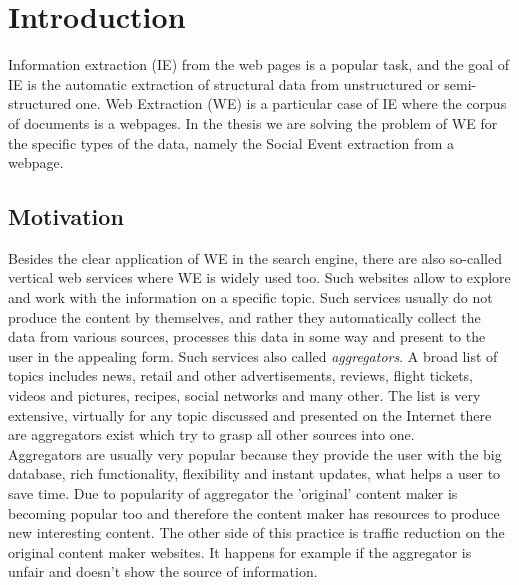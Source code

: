 \chapter{Introduction}
\label{chap:intro}
Information extraction (IE) from the web pages is a popular task, and the goal of IE is the automatic extraction of structural data from unstructured or semi-structured one. Web Extraction (WE) is a particular case of IE where the corpus of documents is a webpages. In the thesis we are solving the problem of WE for the specific types of the data, namely the Social Event extraction from a webpage.   





\section{Motivation}
Besides the clear application of WE in the search engine, there are also so-called vertical web services where WE is widely used too. Such websites allow to explore and work with the information on a specific topic. Such services usually do not produce the content by themselves, and rather they automatically collect the data from various sources, processes this data in some way and present to the user in the appealing form. Such services also called \textit{aggregators}. A broad list of topics includes news, retail and other advertisements, reviews, flight tickets, videos and pictures, recipes, social networks and many other. The list is very extensive, virtually for any topic discussed and presented on the Internet there are aggregators exist which try to grasp all other sources into one. \\

Aggregators are usually very popular because they provide the user with the big database, rich functionality, flexibility and instant updates, what helps a user to save time. Due to popularity of aggregator the 'original' content maker is becoming popular too and therefore the content maker has resources to produce new interesting content. The other side of this practice is traffic reduction on the original content maker websites. It happens for example if the aggregator is unfair and doesn't show the source of information. \\

